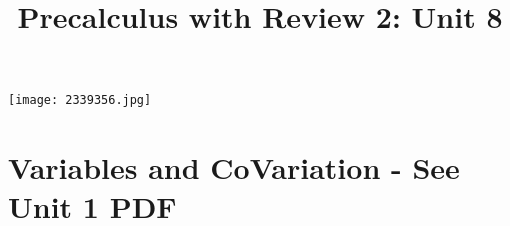 \documentclass[handout]{xourse}
\title{Precalculus with Review 2: Unit 8}
\begin{document}
\texttt{[image: 2339356.jpg]}
\maketitle


	





\part{Variables and CoVariation - See Unit 1 PDF}  %
%
%
%
%
%
%
%
%
\end{document}
